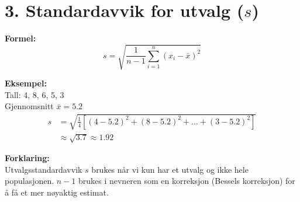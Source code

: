 \documentclass[a4paper,12pt]{article}
\begin{document}
\section*{3. Standardavvik for utvalg ($s$)}
\textbf{Formel:}
\begin{equation}
s = \sqrt{ \frac{1}{n-1} \sum_{i=1}^{n} (x_i - \bar{x})^2 }
\end{equation}

\textbf{Eksempel:}\\
Tall: 4, 8, 6, 5, 3\\
Gjennomsnitt $\bar{x} = 5.2$\\
\begin{align*}
s &= \sqrt{ \frac{1}{4} \left[(4-5.2)^2 + (8-5.2)^2 + \dots + (3-5.2)^2 \right] } \\
  &\approx \sqrt{3.7} \approx 1.92
\end{align*}

\textbf{Forklaring:}\\
Utvalgsstandardavvik $s$ brukes når vi kun har et utvalg og ikke hele populasjonen. $n-1$ brukes i nevneren som en korreksjon (Bessels korreksjon) for å få et mer nøyaktig estimat.
\end{document}
